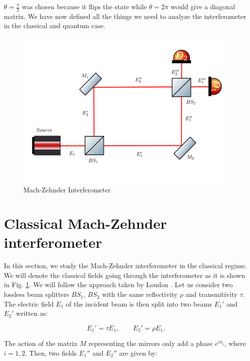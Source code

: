 \documentclass{book}
\begin{document}
$\theta=\frac{\pi}{2}$ was chosen because it flips the state while $\theta=2 \pi$ would give a diagonal matrix. We have now defined all the things we need to analyze the interferometer in the classical and quantum case.

\begin{figure}[H]
\centering
\includegraphics[width=\linewidth]{images/machzenhdercla.png}
\caption{Mach-Zehnder Interferometer}
\label{fig:classical mach}
\end{figure}



\section{Classical Mach-Zehnder interferometer}

In this section, we study the Mach-Zehnder interferometer in the classical regime. We will denote the classical fields going through the interferometer as it is shown in Fig. \ref{fig:classical mach}. We will follow the approach taken by Loudon \cite{ludon}. Let us consider two lossless beam splitters   $BS_{1}$, $BS_{2}$ with the same reflectivity $\rho$ and transmitivity $\tau$. The electric field $E_{1}$ of the incident beam is then split into two beams $E_{1}'$ and $E_{2}'$ written as:

\begin{equation}
E_{1}'=\tau E_{1} ,\qquad E_{2}'=\rho E_{1}.\label{corr1}
\end{equation}

The action of the matrix $M$ representing the mirrors only add a phase $e^{i\phi_{i}}$, where $i=1,2$. Then, two fields $E_{1}''$ and $E_{2}''$ are given by:
\end{document}
